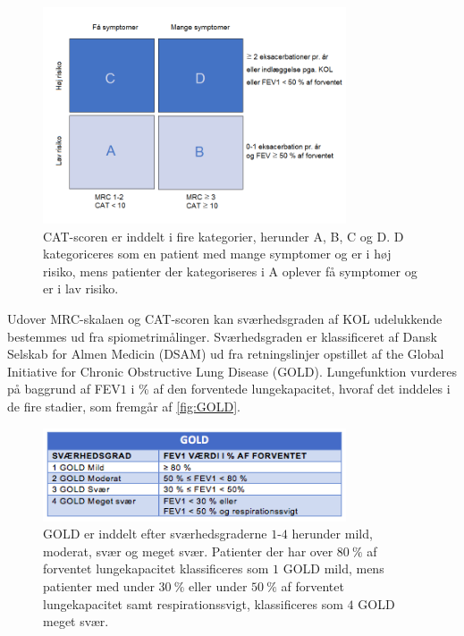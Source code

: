 \begin{figure} [H]
\centering
\includegraphics[width=0.8\textwidth]{figures/CAT}
\caption{CAT-scoren er inddelt i fire kategorier, herunder A, B, C og D. D kategoriceres som en patient med mange symptomer og er i høj risiko, mens patienter der kategoriseres i A oplever få symptomer og er i lav risiko.}
\label{fig:CAT}
\end{figure} 
 
\noindent
Udover MRC-skalaen og CAT-scoren kan sværhedsgraden af KOL udelukkende bestemmes ud fra spiometrimålinger. Sværhedsgraden er klassificeret af Dansk Selskab for Almen Medicin (DSAM) ud fra retningslinjer opstillet af the Global Initiative for Chronic Obstructive Lung Disease (GOLD). Lungefunktion vurderes på baggrund af FEV$1$ i \% af den forventede lungekapacitet, hvoraf det inddeles i de fire stadier, som fremgår af \autoref{fig:GOLD}.

\begin{figure} [H]
\centering
\includegraphics[width=0.8\textwidth]{figures/GOLD}
\caption{GOLD er inddelt efter sværhedsgraderne $1$-$4$ herunder mild, moderat, svær og meget svær. Patienter der har over $80~\%$ af forventet lungekapacitet klassificeres som $1$ GOLD mild, mens patienter med under $30~\%$ eller under $50~\%$ af forventet lungekapacitet samt respirationssvigt, klassificeres som $4$ GOLD meget svær.}
\label{fig:GOLD}
\end{figure} 

